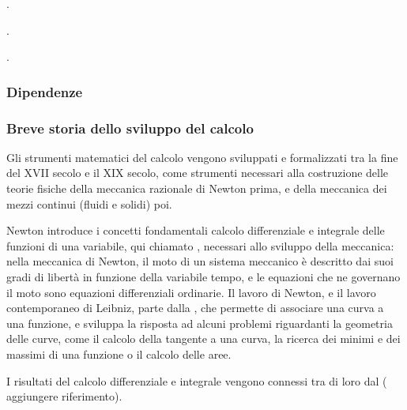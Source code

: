 \documentclass[letterpaper,10pt,italian]{jupyterBook}
\begin{document}
\sphinxAtStartPar
{\hyperref[\detokenize{ch/ode:ode-hs}]{}}. 

\sphinxAtStartPar
{\hyperref[\detokenize{ch/multivariable-calculus:multivariable-calculus}]{}}.

\sphinxAtStartPar
{\hyperref[\detokenize{ch/vector-calculus:vector-calculus}]{}}.
\subsubsection*{Dipendenze}
\subsubsection*{Breve storia dello sviluppo del calcolo}

\sphinxAtStartPar
Gli strumenti matematici del calcolo vengono sviluppati e formalizzati tra la fine del XVII secolo e il XIX secolo, come strumenti necessari alla costruzione delle teorie fisiche della meccanica razionale di Newton prima, e della meccanica dei mezzi continui (fluidi e solidi) poi.

\sphinxAtStartPar
Newton introduce i concetti fondamentali calcolo differenziale e integrale delle funzioni di una variabile, qui chiamato , necessari allo sviluppo della meccanica: nella meccanica di Newton, il moto di un sistema meccanico è descritto dai suoi gradi di libertà in funzione della variabile tempo, e le equazioni che ne governano il moto sono equazioni differenziali ordinarie. Il lavoro di Newton, e il lavoro contemporaneo di Leibniz, parte dalla {\hyperref[\detokenize{ch/analytic_geometry:geometry-analytic}]{}}, che permette di associare una curva a una funzione, e sviluppa la risposta ad alcuni problemi riguardanti la geometria delle curve, come il calcolo della tangente a una curva, la ricerca dei minimi e dei massimi di una funzione o il calcolo delle aree.

\sphinxAtStartPar
I risultati del calcolo differenziale e integrale vengono connessi tra di loro dal  ( aggiungere riferimento).
\end{document}
